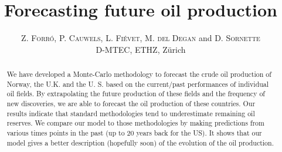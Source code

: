 \documentclass[twoside]{article}
\title{\vspace{-15mm}\fontsize{24pt}{10pt}\selectfont\textbf{Forecasting future oil production}} %
\author{
\large
\textsc{Z. Forr\'o}, %
\textsc{P. Cauwels},
\textsc{L. Fi\'evet}, 
\textsc{M. del Degan} and 
\textsc{D. Sornette}\\[2mm] 
\normalsize D-MTEC, ETHZ, Z\"urich \\ %
\vspace{-5mm}
}
\date{}
\begin{document}
\maketitle %

\thispagestyle{fancy} %


\begin{abstract}

\noindent We  have developed a Monte-Carlo methodology to forecast the crude oil production of Norway, the U.K. and the U. S. based on the current/past performances of individual oil fields. By extrapolating the future production of these fields and the frequency of new discoveries, we are able to forecast the oil production of these countries. Our results indicate that standard methodologies tend to underestimate remaining oil reserves. We compare our model to those methodologies by making predictions from various times points in the past (up to 20 years back for the US). It shows that our model gives a better description (hopefully soon) of the evolution of the oil production.
\end{abstract}

\end{document}
